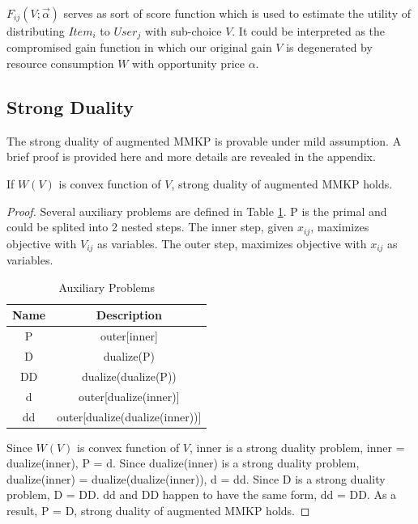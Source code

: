 \documentclass[sigconf]{acmart}
\newcommand{\sx}{x_{ij}}
\newcommand{\sV}{V_{ij}}
\newcommand{\sF}{F_{ij}}
\newcommand{\valpha}{\vec{\alpha}}
\begin{document}
$\sF(V; \valpha)$ serves as sort of score function which is used to estimate
    the utility of distributing $Item_i$ to $User_j$ with sub-choice $V$.
It could be interpreted as the compromised gain function in which
    our original gain $V$ is degenerated by resource consumption $W$ with opportunity price $\alpha$.

\subsection{Strong Duality}

The strong duality of augmented MMKP is provable under mild assumption.
A brief proof is provided here and more details are revealed in the appendix.

\begin{theorem} \label{StrongDualityTheorem}
If $W(V)$ is convex function of $V$, strong duality of augmented MMKP holds.
\end{theorem}

\begin{proof}
Several auxiliary problems are defined in Table \ref{TableAuxiliaryProblems}.
P is the primal and could be splited into 2 nested steps.
The inner step, given $\sx$, maximizes objective with $\sV$ as variables.
The outer step, maximizes objective with $\sx$ as variables.

\begin{table}
\caption{Auxiliary Problems\label{TableAuxiliaryProblems}}
\begin{center}
\begin{tabular}{|c|c|}
\hline
Name   & Description \\
\hline
P      & outer[inner] \\
\hline
D      & dualize(P) \\
\hline
DD     & dualize(dualize(P)) \\
\hline
d      & outer[dualize(inner)] \\
\hline
dd     & outer[dualize(dualize(inner))] \\
\hline
\end{tabular}
\end{center}
\end{table}

Since $W(V)$ is convex function of $V$, inner is a strong duality problem, inner = dualize(inner), P = d.
Since dualize(inner) is a strong duality problem, dualize(inner) = dualize(dualize(inner)), d = dd.
Since D is a strong duality problem, D = DD.
dd and DD happen to have the same form, dd = DD.
As a result, P = D, strong duality of augmented MMKP holds.
\end{proof}
\end{document}
